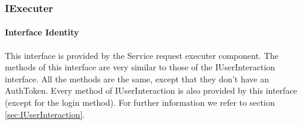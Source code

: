 \subsubsection{IExecuter}
\paragraph{Interface Identity}
This interface is provided by the Service request executer component. The methods
	of this interface are very similar to those of the IUserInteraction interface.
	All the methods are the same, except that they don't have an AuthToken. Every method
	of IUserInteraction is also provided by this interface (except for the login method).
	For further information we refer to section \ref{sec:IUserInteraction}.